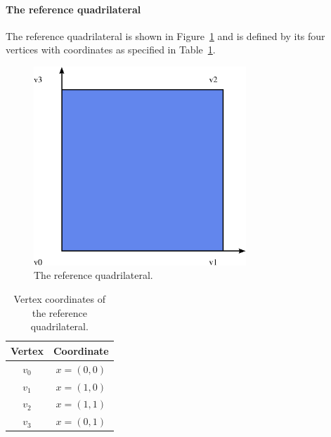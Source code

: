 \paragraph{The reference quadrilateral}

The reference quadrilateral is shown in Figure~\ref{fig:quadrilateral}
and is defined by its four vertices with coordinates as specified in
Table~\ref{tab:quadrilateral,vertices}.

\begin{figure}
  \begin{center}
    \includegraphics[width=8cm]{chapters/alnes-2/pdf/quadrilateral.pdf}
    \caption{The reference quadrilateral.}
    \label{fig:quadrilateral}
  \end{center}
\end{figure}

\begin{table}
\linespread{1.2}\selectfont
  \begin{center}
    \begin{tabular}{|c|c|}
      \hline
      Vertex & Coordinate \\
      \hline
      \hline
      $v_0$ & $x = (0, 0)$ \\
      \hline
      $v_1$ & $x = (1, 0)$ \\
      \hline
      $v_2$ & $x = (1, 1)$ \\
      \hline
      $v_3$ & $x = (0, 1)$ \\
      \hline
    \end{tabular}
    \caption{Vertex coordinates of the reference quadrilateral.}
    \label{tab:quadrilateral,vertices}
  \end{center}
\end{table}

